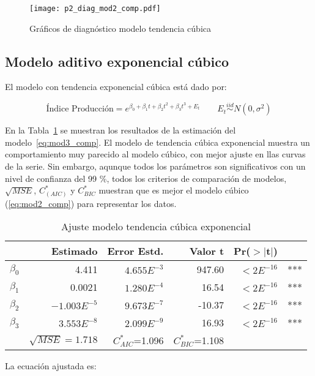 \documentclass{tufte-handout}
\begin{document}
\begin{figure*}[!ht]
    \texttt{[image: p2\_diag\_mod2\_comp.pdf]}
    \caption{Gráficos de diagnóstico modelo tendencia cúbica}
    \label{fig:p2_diag_mod2_comp.pdf}
\end{figure*}

\subsection*{Modelo aditivo exponencial cúbico}

El modelo con tendencia exponencial cúbica está dado por:

\begin{equation} \label{eq:mod3_comp}
	\text{Índice Producción} = e^{\beta_0 + \beta_1 t + \beta_2 t^2 + \beta_3 t^3 + E_t}
	\qquad E_t \stackrel{iid}{\sim} N(0, \sigma^2)
\end{equation}

En la Tabla~\ref{tab:mod3_comp} se muestran los resultados de la estimación del modelo~\ref{eq:mod3_comp}. El modelo de tendencia cúbica exponencial muestra un comportamiento muy parecido al modelo cúbico, con mejor ajuste en llas curvas de la serie. Sin embargo, aqunque todos los parámetros son significativos con un nivel de confianza del 99 \%, todos los criterios de comparación de modelos,  $\sqrt{MSE}$, $C^{*}_(AIC)$ y $C^{*}_{BIC}$ muestran que es mejor el modelo cúbico (\ref{eq:mod2_comp}) para representar los datos.

\begin{table}[ht]
\centering
\begin{tabular}{lrrrrl}
          & Estimado & Error Estd. & Valor t & Pr($>$$|$t$|$) & \\ 
  \hline
$\beta_0$ & 4.411 & $4.655E^{-3}$ & 947.60 & $<2E^{-16}$ & *** \\ 
  $\beta_1$ & 0.0021 & $1.280E^{-4}$ & 16.54 & $<2E^{-16}$ & *** \\ 
  $\beta_2$ & $-1.003E^{-5}$ & $9.673E^{-7}$ & -10.37 & $<2E^{-16}$ & *** \\ 
  $\beta_3$ & $3.553E^{-8}$ & $2.099E^{-9}$ & 16.93 & $<2E^{-16}$ & *** \\ 
   \hline
   & $\sqrt{MSE}=1.718$ & $C^{*}_{AIC}$=1.096 & $C^{*}_{BIC}$=1.108 & \\
   \hline
\end{tabular}
\caption{Ajuste modelo tendencia cúbica exponencial} 
\label{tab:mod3_comp}
\end{table}

La ecuación ajustada es:
\end{document}
